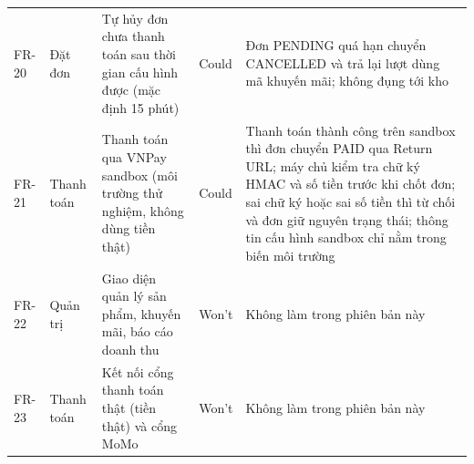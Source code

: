 {\begin{longtable}{@{}L{1.2cm}L{1.6cm}L{4.9cm}L{1.3cm}L{4.9cm}@{}}
FR-20 & Đặt đơn & Tự hủy đơn chưa thanh toán sau thời gian cấu hình được (mặc định 15 phút) & Could & Đơn PENDING quá hạn chuyển CANCELLED và trả lại lượt dùng mã khuyến mãi; không đụng tới kho \\
FR-21 & Thanh toán & Thanh toán qua VNPay sandbox (môi trường thử nghiệm, không dùng tiền thật) & Could & Thanh toán thành công trên sandbox thì đơn chuyển PAID qua Return URL; máy chủ kiểm tra chữ ký HMAC và số tiền trước khi chốt đơn; sai chữ ký hoặc sai số tiền thì từ chối và đơn giữ nguyên trạng thái; thông tin cấu hình sandbox chỉ nằm trong biến môi trường \\
FR-22 & Quản trị & Giao diện quản lý sản phẩm, khuyến mãi, báo cáo doanh thu & Won't & Không làm trong phiên bản này \\
FR-23 & Thanh toán & Kết nối cổng thanh toán thật (tiền thật) và cổng MoMo & Won't & Không làm trong phiên bản này \\
\end{longtable}
}